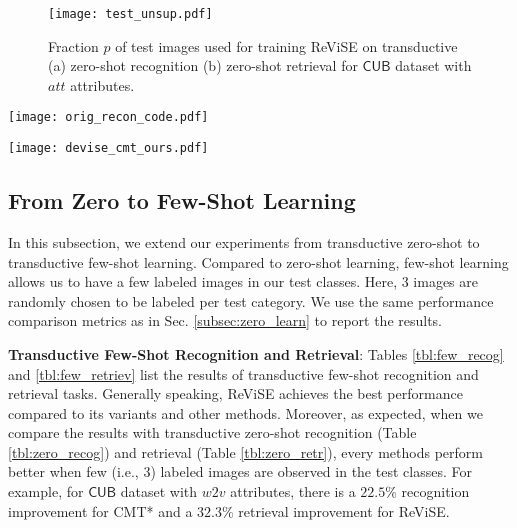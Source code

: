 {{\begin{figure}[t!]
\centering
\texttt{[image: test\_unsup.pdf]}
\caption{\footnotesize Fraction $p$ of test images used for training ReViSE on transductive (a) zero-shot recognition (b) zero-shot retrieval for $\mathsf{CUB}$ dataset with $\textit{att}$ attributes.}
\label{fig:test_unsup}
\vspace{-3mm}
\end{figure}


}

\begin{figure*}[t!]
\vspace{-3mm}
\centering
\texttt{[image: orig\_recon\_code.pdf]}
\caption{\footnotesize (a) Original CNN features (b) Reconstructed features (c) Visual codes for $\mathsf{AwA}$ dataset in ReViSE under transductive zero-shot setting. We use $\textit{glo}$ as our textual attributes for classes. Different colors denote different classes. Best viewed in colors.}
\label{fig:orig_recon_code}
\vspace{-4mm}
\end{figure*}

\begin{figure*}[t!]
\centering
\texttt{[image: devise\_cmt\_ours.pdf]}
\caption{\footnotesize Output features of : (a) DeViSE* (b) CMT* (c) ReViSE. $\textit{glo}$ attributes are used on $\mathsf{AwA}$ dataset under transductive zero-shot setting. Different colors denote different classes. Best view in colors.}
\label{fig:devise_cmt_ours}
\vspace{-3mm}
\end{figure*}

\subsection{From Zero to Few-Shot Learning}
\label{subsec:few_shot}
{

In this subsection, we extend our experiments from transductive zero-shot to transductive few-shot learning. 
Compared to zero-shot learning, few-shot learning allows us to have a few labeled images in our test classes. Here, 3 images are randomly chosen to be labeled per test category. We use the same performance comparison metrics as in Sec. \ref{subsec:zero_learn} to report the results.

\vspace{0.1in}
\hspace{-5mm} {\bf Transductive Few-Shot Recognition and Retrieval}:
Tables \ref{tbl:few_recog} and \ref{tbl:few_retriev} list the results of transductive few-shot recognition and retrieval tasks. Generally speaking, ReViSE achieves the best performance compared to its variants and other methods. Moreover, as expected, when we compare the results with transductive zero-shot recognition (Table \ref{tbl:zero_recog}) and retrieval (Table \ref{tbl:zero_retr}), every methods perform better when few (i.e., $3$) labeled images are observed in the test classes. For example, for $\mathsf{CUB}$ dataset with $\textit{w2v}$ attributes, there is a $22.5\%$ recognition improvement for CMT* and a $32.3\%$ retrieval improvement for ReViSE. 

}}
